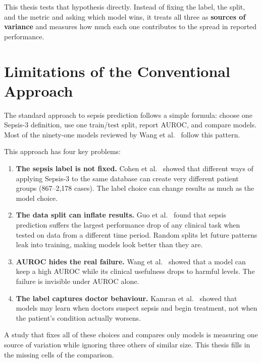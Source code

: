 This thesis tests that hypothesis directly. Instead of fixing the label, the
split, and the metric and asking which model wins, it treats all three as
\textbf{sources of variance} and measures how much each one contributes to the
spread in reported performance.


\section{Limitations of the Conventional Approach}

The standard approach to sepsis prediction follows a simple formula: choose one
Sepsis-3 definition, use one train/test split, report AUROC, and compare models.
Most of the ninety-one models reviewed by Wang et al.\ \cite{wang2025srpm}
follow this pattern.

This approach has four key problems:

\begin{enumerate}
    \item \textbf{The sepsis label is not fixed.} Cohen et al.\
    \cite{cohen2024subtle} showed that different ways of applying Sepsis-3 to
    the same database can create very different patient groups (867--2,178 cases).
    The label choice can change results as much as the model choice.

    \item \textbf{The data split can inflate results.} Guo et al.\
    \cite{guo2022temporal} found that sepsis prediction suffers the largest
    performance drop of any clinical task when tested on data from a different time
    period. Random splits let future patterns leak into training, making models
    look better than they are.

    \item \textbf{AUROC hides the real failure.} Wang et al.\
    \cite{wang2025srpm} showed that a model can keep a high AUROC while its
    clinical usefulness drops to harmful levels. The failure is invisible under
    AUROC alone.

    \item \textbf{The label captures doctor behaviour.} Kamran et al.\
    \cite{kamran2024evaluation} showed that models may learn when doctors
    suspect sepsis and begin treatment, not when the patient's condition actually
    worsens.
\end{enumerate}

A study that fixes all of these choices and compares only models is measuring
one source of variation while ignoring three others of similar size. This thesis
fills in the missing cells of the comparison.


